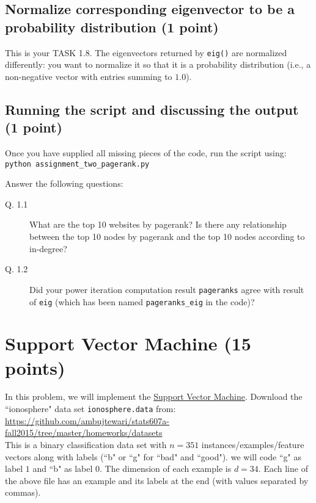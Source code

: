 \documentclass{article}
\begin{document}
\subsection{Normalize corresponding eigenvector to be a probability distribution (1 point)}

This is your TASK 1.8. The eigenvectors returned by {\tt eig()} are normalized differently: you want to normalize it so that it is a probability distribution (i.e.,
a non-negative vector with entries summing to $1.0$).

\subsection{Running the script and discussing the output (1 point)}

Once you have supplied all missing pieces of the code, run the script using:\\
{\tt python assignment\_two\_pagerank.py}

Answer the following questions:
\begin{description}
\item[Q. 1.1]
What are the top 10 websites by pagerank? Is there any relationship between the top 10 nodes by pagerank and the top 10 nodes according to in-degree?
\item[Q. 1.2]
Did your power iteration computation result {\tt pageranks} agree with result of {\tt eig} (which has been named {\tt pageranks\_eig} in the code)?
\end{description}


\section{Support Vector Machine (15 points)}


In this problem, we will implement the \href{http://en.wikipedia.org/wiki/Support\_vector\_machine}{Support Vector Machine}.
Download the ``ionosphere" data set {\tt ionosphere.data} from:\\
\url{https://github.com/ambujtewari/stats607a-fall2015/tree/master/homeworks/datasets} \\
This is a binary classification data set with $n=351$ instances/examples/feature vectors along with labels (``b" or ``g" for ``bad" and ``good"). we will code ``g"
as label $1$ and ``b" as label $0$.
The dimension of each example is $d=34$. Each line of the above file has an example and its labels at the end (with values separated by commas).
\end{document}
